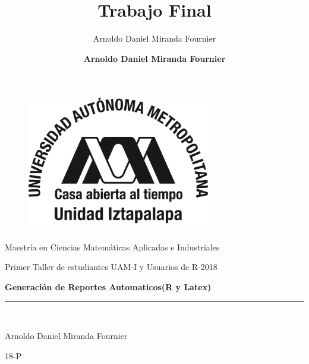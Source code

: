 \documentclass[12pt,a4paper]{article}\usepackage[]{graphicx}\usepackage[]{color}
\author{Arnoldo Daniel Miranda Fournier }
\title{Trabajo Final}
\title{\textbf{Generacion de Reportes Automaticos(R y Latex)\\ \begin{normalsize}
\emph{}
\end{normalsize}}}
\author{\begin{normalsize}
\textbf{Arnoldo Daniel Miranda Fournier}
\end{normalsize}}
\date{}
\begin{document}
\begin{titlepage}

\vspace*{1.2in}

\begin{center}
\vspace*{-1in}
\begin{figure}[htb]
\begin{center}
\includegraphics[width=8cm]{Logo_UAM_I}
\end{center}
\end{figure}

Maestr\'ia en Ciencias Matem\'aticas Aplicadas e Industriales\\
\vspace*{0.15in}

\vspace*{0.10in}
\begin{large}
Primer Taller de estudiantes UAM-I y  Usuarios  de R-2018\\
\end{large}
\vspace*{0.2in}
\begin{Large}
\textbf{Generaci\'on de Reportes Automaticos(R y Latex)} \\
\end{Large}
\vspace*{0.25in}
\rule{80mm}{0.1mm}\\
\vspace*{0.1in}
\begin{large}
Arnoldo Daniel Miranda Fournier\\
\end{large}
\vspace*{0.1in}
\begin{large}
18-P\\
\end{large}
\end{center}

\end{titlepage}
\end{document}
